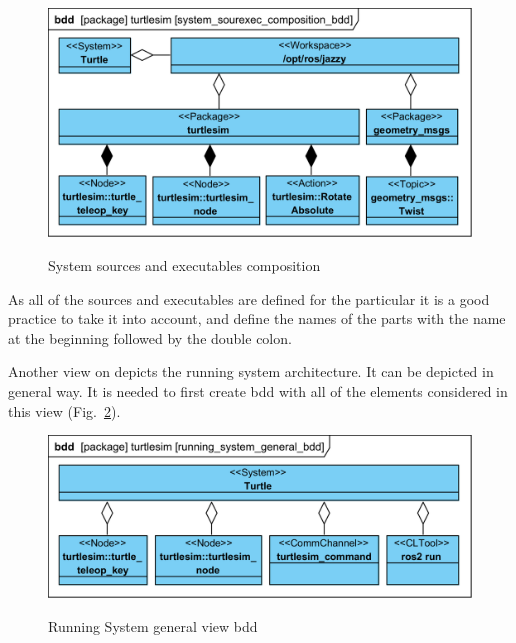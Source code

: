 \documentclass[11pt,oneside,a4paper]{report}
\begin{document}
\begin{figure}[H]
	\centering
	\begin{center}
		{\includegraphics[scale=1.0]{diagrams/system_sourexec_composition_bdd.png}}
	\end{center}
	\caption{System sources and executables composition}
	\label{fig:system_sourexec_composition_bdd}
\end{figure}

As all of the sources and executables are defined for the particular \stPackage{} it is a good practice to take it into account, and define the names of the \stPackage{} parts with the \stPackage{} name at the beginning followed by the double colon. 

\pagebreak

Another view on \stSystem{} depicts the running system architecture. It can be depicted in general way. It is needed to first create bdd with all of the elements considered in this view (Fig.~\ref{fig:running_system_general_bdd}).
			
\begin{figure}[H]
	\centering
	\begin{center}
		{\includegraphics[scale=1.0]{diagrams/running_system_general_bdd.png}}
	\end{center}
	\caption{Running System general view bdd}
	\label{fig:running_system_general_bdd}
\end{figure}
\end{document}
